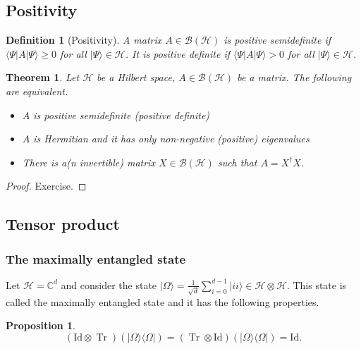 \documentclass{article}
\newtheorem{proposition}{Proposition}
\newtheorem{theorem}{Theorem}
\newtheorem{definition}{Definition}
\theoremstyle{definition}
\newcommand{\tr}{\operatorname{Tr}}
\newcommand{\id}{\mathrm{Id}}
\newcommand{\ket}[1]{\vert #1 \rangle}
\newcommand{\bra}[1]{\langle #1 \vert}
\newcommand{\bounded}[1]{\mathcal{B}(#1)}
\begin{document}
\subsection{Positivity}

\begin{definition}[Positivity]
  A matrix $A\in \bounded{\mathcal{H}}$ is \emph{positive semidefinite} if $\bra{\Psi} A\ket{\Psi} \geq 0$ for all $\ket{\Psi}\in\mathcal{H}$. It is \emph{positive definite} if $\bra{\Psi} A\ket{\Psi} > 0$ for all $\ket{\Psi}\in\mathcal{H}$. 
\end{definition}

\begin{theorem}
  Let $\mathcal{H}$ be a Hilbert space, $A\in\bounded{\mathcal{H}}$ be a matrix. The following are equivalent.
  \begin{itemize}
    \item $A$ is positive semidefinite (positive definite)
    \item $A$ is Hermitian and it has only non-negative (positive) eigenvalues
    \item There is a(n invertible) matrix $X\in \bounded{\mathcal{H}}$ such that $A = X^\dagger X$.
  \end{itemize}
\end{theorem}

\begin{proof}
  Exercise.
\end{proof}

\subsection{Tensor product}

\subsubsection{The maximally entangled state}

Let $\mathcal{H} = \mathbb{C}^d$ and consider the state $\ket{\Omega} = \frac{1}{\sqrt{d}}\sum_{i=0}^{d-1} \ket{ii}\in\mathcal{H}\otimes\mathcal{H}$. This state is called the maximally entangled state and it has the following properties.


\begin{proposition}\label{prop:max_ent_partial_tr}
  \begin{equation*}
    (\id \otimes \tr )(\ket{\Omega}\bra{\Omega}) = (\tr \otimes\id)(\ket{\Omega}\bra{\Omega})  = \id.
  \end{equation*}
\end{proposition}
\end{document}
